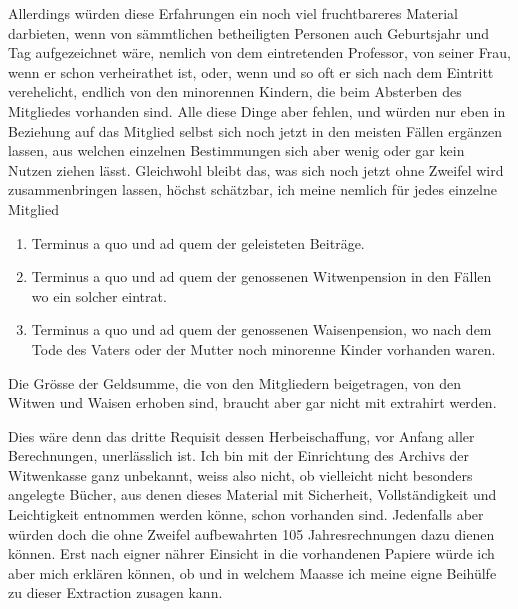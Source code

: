 \documentclass[12pt,a4paper]{article}
\begin{document}
Allerdings w\"urden diese Erfahrungen ein noch viel fruchtbareres Material darbieten, wenn von s\"ammtlichen betheiligten Personen auch Geburtsjahr und Tag aufgezeichnet w\"are, nemlich von dem eintretenden Professor, von seiner Frau, wenn er schon verheirathet ist, oder, wenn und so oft er sich nach dem Eintritt verehelicht, endlich von den minorennen Kindern, die beim Absterben des Mitgliedes vorhanden sind. Alle diese Dinge aber fehlen, und w\"urden nur eben in Beziehung auf das Mitglied selbst sich noch jetzt in den meisten F\"allen erg\"anzen lassen, aus welchen einzelnen Bestimmungen sich aber wenig oder gar kein Nutzen ziehen l\"asst. Gleichwohl bleibt das, was sich noch jetzt ohne Zweifel wird zusammenbringen lassen, h\"ochst sch\"atzbar, ich meine nemlich f\"ur jedes einzelne Mitglied
\begin{enumerate}
\item Terminus a quo und ad quem der geleisteten Beitr\"age.
\item Terminus a quo und ad quem der genossenen Witwenpension in den F\"allen wo ein solcher eintrat.
\item Terminus a quo und ad quem der genossenen Waisenpension, wo nach dem Tode des Vaters oder der Mutter noch minorenne Kinder vorhanden waren.
\end{enumerate}
Die Gr\"osse der Geldsumme, die von den Mitgliedern beigetragen, von den Witwen und Waisen erhoben sind, braucht aber gar nicht mit extrahirt werden.

Dies w\"are denn das dritte Requisit dessen Herbeischaffung, vor Anfang aller Berechnungen, unerl\"asslich ist. Ich bin mit der Einrichtung des Archivs der Witwenkasse ganz unbekannt, weiss also nicht, ob vielleicht nicht besonders angelegte B\"ucher, aus denen dieses Material mit Sicherheit, Vollst\"andigkeit und Leichtigkeit entnommen werden k\"onne, schon vorhanden sind. Jedenfalls aber w\"urden doch die ohne Zweifel aufbewahrten 105 Jahresrechnungen dazu dienen k\"onnen. Erst nach eigner n\"ahrer Einsicht in die vorhandenen Papiere w\"urde ich aber mich erkl\"aren k\"onnen, ob und in welchem Maasse ich meine eigne Beih\"ulfe zu dieser Extraction zusagen kann.
\end{document}
